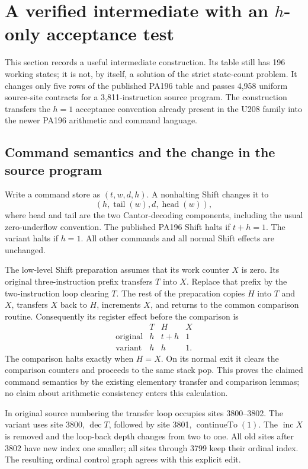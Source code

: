 \section{A verified intermediate with an \texorpdfstring{$h$}{h}-only acceptance test}
\label{sec:h-only-intermediate}
This section records a useful intermediate construction.  Its table still has
196 working states; it is not, by itself, a solution of the strict state-count
problem.  It changes only five rows of the published PA196 table and passes
4,958 uniform source-site contracts for a 3,811-instruction source program.
The construction transfers the $h=1$ acceptance convention already present in
the U208 family into the newer PA196 arithmetic and command language.

\subsection{Command semantics and the change in the source program}
Write a command store as $(t,w,d,h)$.  A nonhalting Shift changes it to
\[
  (h,\operatorname{tail}(w),d,\operatorname{head}(w)),
\]
where head and tail are the two Cantor-decoding components, including the
usual zero-underflow convention.  The published PA196 Shift halts if
$t+h=1$.  The variant halts if $h=1$.  All other commands and all normal
Shift effects are unchanged.

The low-level Shift preparation assumes that its work counter $X$ is zero.
Its original three-instruction prefix transfers $T$ into $X$.  Replace that
prefix by the two-instruction loop clearing $T$.  The rest of the preparation
copies $H$ into $T$ and $X$, transfers $X$ back to $H$, increments $X$, and
returns to the common comparison routine.  Consequently its register effect
before the comparison is
\[
\begin{array}{c|ccc}
 &T&H&X\\\hline
\text{original}&h&t+h&1\\
\text{variant}&h&h&1.
\end{array}
\]
The comparison halts exactly when $H=X$.  On its normal exit it clears the
comparison counters and proceeds to the same stack pop.  This proves the
claimed command semantics by the existing elementary transfer and comparison
lemmas; no claim about arithmetic consistency enters this calculation.

In original source numbering the transfer loop occupies sites 3800--3802.
The variant uses site 3800, $\operatorname{dec}T$, followed by site 3801,
$\operatorname{continueTo}(1)$.  The $\operatorname{inc}X$ is removed and the
loop-back depth changes from two to one.  All old sites after 3802 have new
index one smaller; all sites through 3799 keep their ordinal index.  The
resulting ordinal control graph agrees with this explicit edit.

